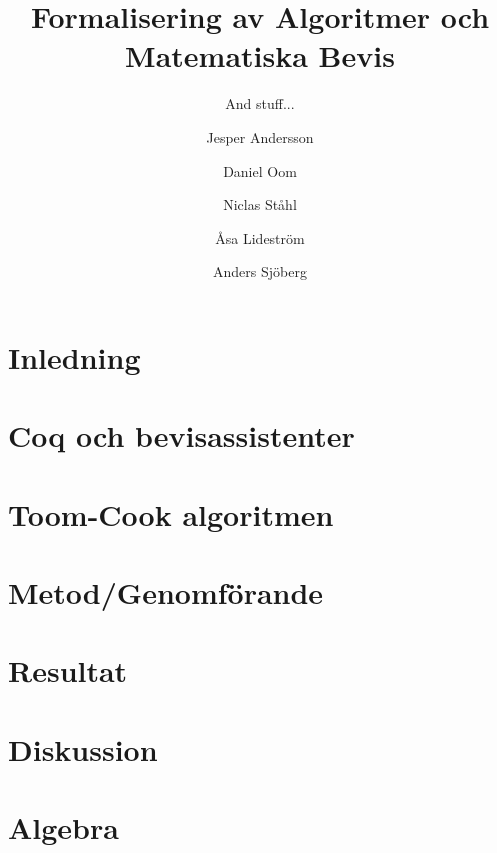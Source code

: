 \documentclass[bachelors,a4paper,gu]{chalmers-thesis}
\title{Formalisering av Algoritmer och Matematiska Bevis}
\subtitle{And stuff...}
\author{Jesper Andersson\and Daniel Oom\and Niclas Ståhl\and Åsa Lideström\and Anders Sjöberg}
\begin{document}
\maketitle

\chapter{Inledning}


\newpage
\chapter{Coq och bevisassistenter}




\newpage
\chapter{Toom-Cook algoritmen}



\newpage
\chapter{Metod/Genomförande}


\newpage
\chapter{Resultat}



\newpage
\chapter{Diskussion}


\newpage
\nocite{*}
\printbibliography

\appendix
\newpage
\chapter{Algebra}

\end{document}

